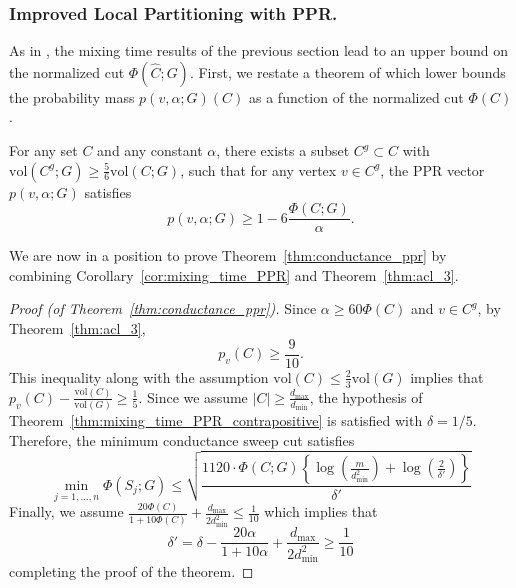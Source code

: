 \documentclass[11pt,twoside]{article}
\newcommand{\vol}{\mathrm{vol}}
\newcommand{\abs}[1]{\left \lvert #1 \right \rvert}
\newcommand{\1}{\mathbbm{1}}
\newcommand{\Cest}{\widehat{C}}
\begin{document}
\subsubsection{Improved Local Partitioning with PPR.}

As in \citet{andersen2006}, the mixing time results of the previous section lead to an upper bound on the normalized cut $\Phi(\Cest;G)$. First, we restate a theorem of \citet{andersen2006} which lower bounds the probability mass $p(v,\alpha;G)(C)$ as a function of the normalized cut $\Phi(C)$. 

\begin{theorem}
	\label{thm:acl_3}
	For any set $C$ and any constant $\alpha$, there exists a subset $C^g \subset C$ with $\vol(C^g;G) \geq \frac{5}{6}\vol(C;G)$, such that for any vertex $v \in C^g$, the PPR vector $p(v,\alpha;G)$ satisfies
	\begin{equation*}
	p(v,\alpha;G) \geq 1 - 6\frac{\Phi(C;G)}{\alpha}.
	\end{equation*}
\end{theorem}
We are now in a position to prove Theorem~\ref{thm:conductance_ppr} by combining Corollary~\ref{cor:mixing_time_PPR} and Theorem~\ref{thm:acl_3}.

\begin{proof}[Proof (of Theorem~\ref{thm:conductance_ppr})]
	Since $\alpha \geq 60\Phi(C)$ and $v \in C^g$, by Theorem~\ref{thm:acl_3},
	\begin{equation*}
	p_v(C) \geq \frac{9}{10}.
	\end{equation*}
	This inequality along with the assumption $\vol(C) \leq \frac{2}{3}\vol(G)$ implies that $p_v(C) - \frac{\vol(C)}{\vol(G)} \geq \frac{1}{5}$. Since we assume $\abs{C} \geq \frac{d_{\max}}{d_{\min}}$, the hypothesis of Theorem~\ref{thm:mixing_time_PPR_contrapositive} is satisfied with $\delta = 1/5$. Therefore, the minimum conductance sweep cut satisfies
	\begin{equation*}
	\min_{j = 1,\ldots,n} \Phi(S_j;G) \leq \sqrt{\frac{1120\cdot \Phi(C;G)\left\{\log\left(\frac{m}{d_{\min}^2}\right) + \log\left(\frac{2}{\delta'}\right)\right\}}{\delta'}}
	\end{equation*}
	Finally, we assume $\frac{20\Phi(C)}{1 + 10\Phi(C)} + \frac{d_{\max}}{2d_{\min}^2} \leq \frac{1}{10}$ which implies that
	\begin{equation*}
	\delta' = \delta - \frac{20\alpha}{1 + 10\alpha} + \frac{d_{\max}}{2d_{\min}^2} \geq \frac{1}{10} 
	\end{equation*}
	completing the proof of the theorem.
\end{proof}
\end{document}

